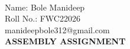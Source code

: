 \documentclass[10pt,a4paper]{report}
\begin{document}
 \vspace{3mm}\\ \raggedleft Name: Bole Manideep\vspace{2mm}\\ \raggedleft Roll No.: FWC22026\vspace{2mm}\\ \raggedleft manideepbole312@gmail.com \vspace{10mm}
\\ \centering \Large \textbf{ASSEMBLY ASSIGNMENT} \normalsize \vspace{15mm}
\end{document}

